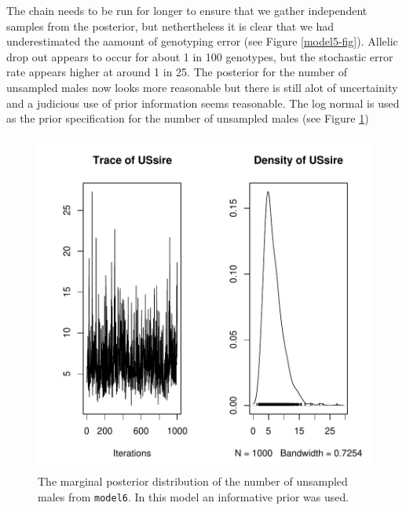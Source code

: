 \documentclass{article}
\begin{document}
The chain needs to be run for longer to ensure that we gather independent samples from the posterior, but nethertheless it is clear that we had underestimated  the aamount of genotyping error (see Figure \ref{model5-fig}).  Allelic drop out appears to occur for about 1 in 100 genotypes, but the stochastic error rate appears higher at around 1 in 25. The posterior for the number of unsampled males now looks more reasonable but there is still alot of uncertainity and a judicious use of prior information seems reasonable.  The log normal is used as the prior specification for the number of unsampled males (see Figure \ref{model6US-fig})


\begin{Schunk}
\end{Schunk}


\begin{figure}[!h]
\begin{center}
\includegraphics{Tutorial-039}
\end{center}
\caption{The marginal posterior distribution of the number of unsampled males from \texttt{model6}. In this model an informative prior was used.}
\label{model6US-fig}
\end{figure}
\end{document}

